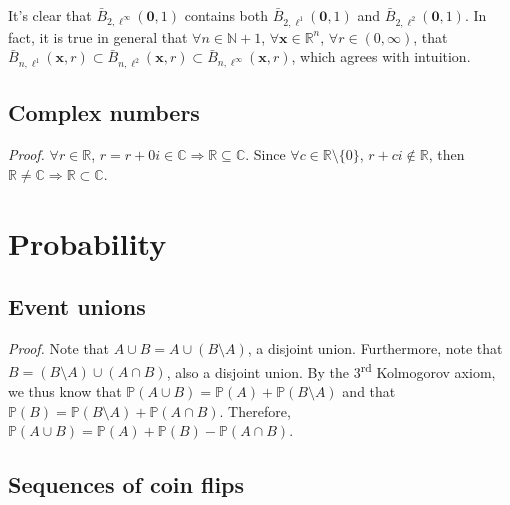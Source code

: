 \documentclass{article}
\numberwithin{equation}{section}
\begin{document}
It's clear that $ \bar{B}_{2, \ell^\infty}(\mathbf{0}, 1) $ contains both
$ \bar{B}_{2, \ell^1}(\mathbf{0}, 1) $ and
$ \bar{B}_{2, \ell^2}(\mathbf{0}, 1) $. In fact, it is true in general that
$ \forall n \in \mathbb{N} + 1 $, $ \forall \mathbf{x} \in \mathbb{R}^n $,
$ \forall r \in (0, \infty) $, that $ \bar{B}_{n, \ell^1}(\mathbf{x}, r)
\subset \bar{B}_{n, \ell^2}(\mathbf{x}, r) \subset
\bar{B}_{n, \ell^\infty}(\mathbf{x}, r) $, which agrees with intuition.

\subsection{Complex numbers}

\textit{Proof.} $ \forall r \in \mathbb{R} $, $ r = r + 0i \in \mathbb{C}
\Rightarrow \mathbb{R} \subseteq \mathbb{C} $. Since $ \forall c \in
\mathbb{R} \setminus \{0\} $, $ r + ci \notin \mathbb{R} $, then
$ \mathbb{R} \ne \mathbb{C} \Rightarrow \mathbb{R} \subset \mathbb{C} $.

\section{Probability}

\subsection{Event unions}

\textit{Proof.} Note that $ A \cup B = A \cup (B \setminus A) $, a disjoint
union. Furthermore, note that $ B = (B \setminus A) \cup (A \cap B) $, also a
disjoint union. By the 3\textsuperscript{rd} Kolmogorov axiom, we thus know
that $ \mathbb{P}(A \cup B) = \mathbb{P}(A) + \mathbb{P}(B \setminus A) $ and
that $ \mathbb{P}(B) = \mathbb{P}(B \setminus A) + \mathbb{P}(A \cap B) $.
Therefore, $ \mathbb{P}(A \cup B) = \mathbb{P}(A) + \mathbb{P}(B) -
\mathbb{P}(A \cap B) $.

\subsection{Sequences of coin flips}
\end{document}
